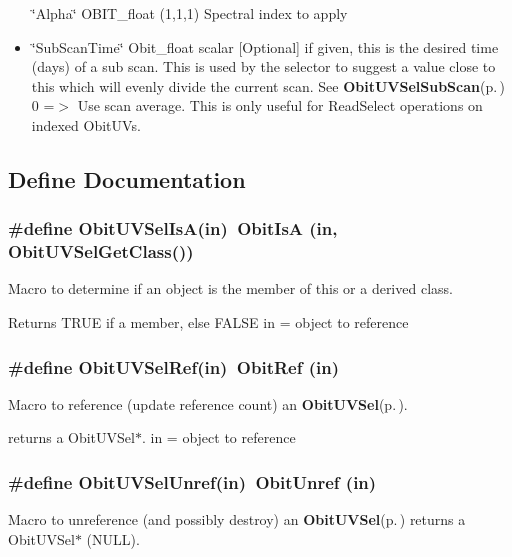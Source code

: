 \begin{itemize}
\char`\"{}Alpha\char`\"{} OBIT\_\-float (1,1,1) Spectral index to apply \item \char`\"{}Sub\-Scan\-Time\char`\"{} Obit\_\-float scalar [Optional] if given, this is the desired time (days) of a sub scan. This is used by the selector to suggest a value close to this which will evenly divide the current scan. See {\bf Obit\-UVSel\-Sub\-Scan}{\rm (p.\,\pageref{ObitUVSel_8c_a21})} 0 =$>$ Use scan average. This is only useful for Read\-Select operations on indexed Obit\-UVs.\end{itemize}


\subsection{Define Documentation}
\subsubsection{\setlength{\rightskip}{0pt plus 5cm}\#define Obit\-UVSel\-Is\-A(in)\ Obit\-Is\-A (in, Obit\-UVSel\-Get\-Class())}\label{ObitUVSel_8h_a2}


Macro to determine if an object is the member of this or a derived class. 

Returns TRUE if a member, else FALSE in = object to reference 
\subsubsection{\setlength{\rightskip}{0pt plus 5cm}\#define Obit\-UVSel\-Ref(in)\ Obit\-Ref (in)}\label{ObitUVSel_8h_a1}


Macro to reference (update reference count) an {\bf Obit\-UVSel}{\rm (p.\,\pageref{structObitUVSel})}. 

returns a Obit\-UVSel$\ast$. in = object to reference 
\subsubsection{\setlength{\rightskip}{0pt plus 5cm}\#define Obit\-UVSel\-Unref(in)\ Obit\-Unref (in)}\label{ObitUVSel_8h_a0}


Macro to unreference (and possibly destroy) an {\bf Obit\-UVSel}{\rm (p.\,\pageref{structObitUVSel})} returns a Obit\-UVSel$\ast$ (NULL). 

